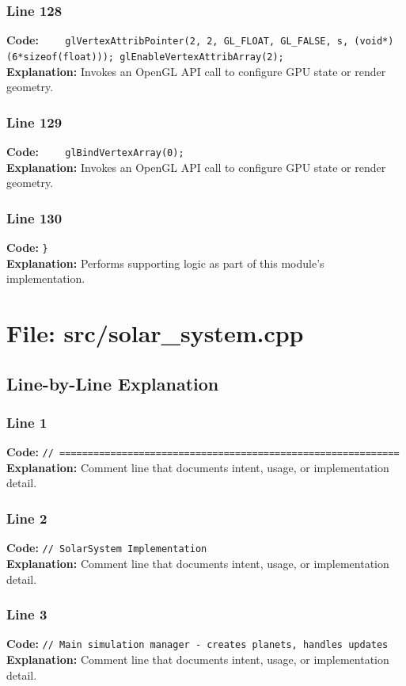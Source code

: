 \documentclass[11pt,a4paper]{article}
\begin{document}
\subsubsection*{Line 128}
\textbf{Code:} \verb|    glVertexAttribPointer(2, 2, GL_FLOAT, GL_FALSE, s, (void*)(6*sizeof(float))); glEnableVertexAttribArray(2);|\\
\textbf{Explanation:} Invokes an OpenGL API call to configure GPU state or render geometry.

\subsubsection*{Line 129}
\textbf{Code:} \verb|    glBindVertexArray(0);|\\
\textbf{Explanation:} Invokes an OpenGL API call to configure GPU state or render geometry.

\subsubsection*{Line 130}
\textbf{Code:} \verb|}|\\
\textbf{Explanation:} Performs supporting logic as part of this module's implementation.

\newpage
\section{File: src/solar\_system.cpp}
\subsection{Line-by-Line Explanation}
\subsubsection*{Line 1}
\textbf{Code:} \verb|// ============================================================|\\
\textbf{Explanation:} Comment line that documents intent, usage, or implementation detail.

\subsubsection*{Line 2}
\textbf{Code:} \verb|// SolarSystem Implementation|\\
\textbf{Explanation:} Comment line that documents intent, usage, or implementation detail.

\subsubsection*{Line 3}
\textbf{Code:} \verb|// Main simulation manager - creates planets, handles updates|\\
\textbf{Explanation:} Comment line that documents intent, usage, or implementation detail.
\end{document}
